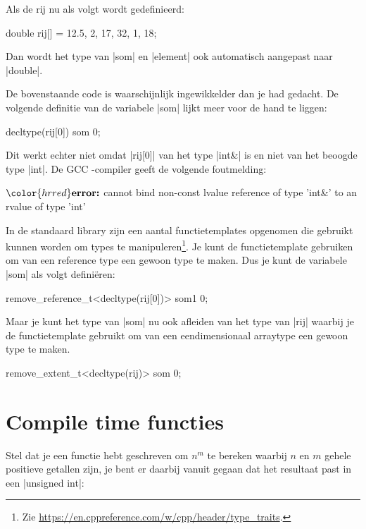 \begin{cpplstShortInline}
Als de rij nu als volgt wordt gedefinieerd:
\begin{cpplstfragment}
	double rij[] = {12.5, 2, 17, 32, 1, 18};
\end{cpplstfragment}
Dan wordt het type van |som| en |element| ook automatisch aangepast naar |double|.

De bovenstaande code is waarschijnlijk ingewikkelder dan je had gedacht.
De volgende definitie van de variabele |som| lijkt meer voor de hand te liggen:
\begin{cpplstfragment}
	decltype(rij[0]) som {0};
\end{cpplstfragment}
Dit werkt echter niet omdat |rij[0]| van het type |int&| is en niet van het beoogde type |int|.
De GCC \Cpp{}\hyp{}compiler geeft de volgende foutmelding:
\begin{lstfragment}[mathescape=true]
$\color{hrred}\textbf{error:}$ cannot bind non-const lvalue reference of type 'int&' to an rvalue of type 'int'
\end{lstfragment}
In de standaard \Cpp{} library zijn een aantal functietemplates opgenomen die gebruikt kunnen worden om types te manipuleren\footnote{%
	Zie \url{https://en.cppreference.com/w/cpp/header/type_traits}.
}.
Je kunt de functietemplate \href{https://en.cppreference.com/w/cpp/types/remove_reference}{} gebruiken om van een reference type een gewoon type te maken.
Dus je kunt de variabele |som| als volgt definiëren:
\begin{cpplstfragment}
	remove_reference_t<decltype(rij[0])> som1 {0};
\end{cpplstfragment}

Maar je kunt het type van |som| nu ook afleiden van het type van |rij| waarbij je de functietemplate \href{https://en.cppreference.com/w/cpp/types/remove_extent}{} gebruikt om van een eendimensionaal arraytype een gewoon type te maken.
\begin{cpplstfragment}
    remove_extent_t<decltype(rij)> som {0};
\end{cpplstfragment}

\section{Compile time functies}
\label{compile time functies}
Stel dat je een functie hebt geschreven om $n^m$ te bereken waarbij $n$ en $m$ gehele positieve getallen zijn, je bent er daarbij vanuit gegaan dat het resultaat past in een |unsigned int|:


\end{cpplstShortInline}
